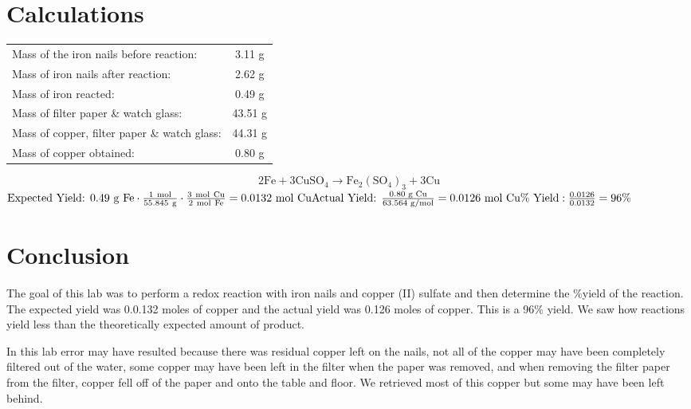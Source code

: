 \documentclass[12pt]{article}
\begin{document}
    \section*{Calculations}
        \begin{table}[h]
            \centering
            \begin{tabular}{lc}
                Mass of the iron nails before reaction: & 3.11 g\\
                Mass of iron nails after reaction: & 2.62 g\\
                Mass of iron reacted: & 0.49 g\\
                Mass of filter paper \& watch glass: & 43.51 g\\
                Mass of copper, filter paper \& watch glass: & 44.31 g\\
                Mass of copper obtained: & 0.80 g
            \end{tabular}
        \end{table}
        \begin{equation*}
          2 \mathrm{Fe} + 3 \mathrm{CuSO}_4 \rightarrow \mathrm{Fe}_2(\mathrm{SO}_4)_3 + 3 \mathrm{Cu}
        \end{equation*}
        \(
            \text{Expected Yield: }0.49~\mathrm{g~Fe}\cdot \frac{1~\mathrm{mol}}{55.845~\mathrm{g}}\cdot \frac{3~\mathrm{mol~Cu}}{2~\mathrm{mol~Fe}} = 0.0132~\mathrm{mol~Cu}\\
            \text{Actual Yield: } \frac{0.80\text{ g Cu}}{63.564\text{ g/mol}} = 0.0126\text{ mol Cu}\\
            \text{\% Yield}: \frac{0.0126}{0.0132} = 96\%
        \)
    \section*{Conclusion}
        The goal of this lab was to perform a redox reaction with iron nails and copper (II) sulfate and then determine the \%yield of the reaction. The expected yield was 0.0.132 moles of copper and the actual yield was 0.126 moles of copper. This is a 96\% yield. We saw how reactions yield less than the theoretically expected amount of product.

        In this lab error may have resulted because there was residual copper left on the nails, not all of the copper may have been completely filtered out of the water, some copper may have been left in the filter when the paper was removed, and when removing the filter paper from the filter, copper fell off of the paper and onto the table and floor. We retrieved most of this copper but some may have been left behind.
\end{document}
